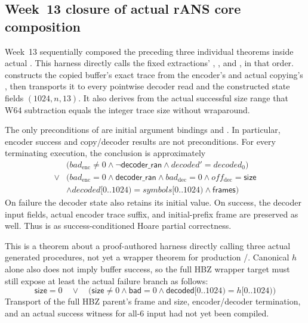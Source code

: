 \subsection{Week~13 closure of actual rANS core composition}

Week~13 sequentially composed the preceding three individual theorems inside
actual . This harness directly calls the
fixed extractions' ,
, and , in that order.
 constructs the copied buffer's
exact trace from the encoder's  and actual copying's
, then transports it to every pointwise decoder read and
the constructed state fields \((1024,n,13)\). It also derives from the actual
successful size range that W64 subtraction equals the integer trace size
without wraparound.

The only preconditions of 
are initial argument bindings and . In
particular, encoder success and copy/decoder results are not preconditions.
For every terminating execution, the conclusion is approximately
\[
\begin{aligned}
  &\bigl(bad_{\mathrm{enc}}\ne0
    \land\neg\mathsf{decoder\_ran}
    \land decoded'=decoded_0\bigr)\\
  {}\lor{}&\bigl(bad_{\mathrm{enc}}=0
    \land\mathsf{decoder\_ran}
    \land bad_{\mathrm{dec}}=0
    \land off_{\mathrm{dec}}=\mathsf{size}\\
    &\land decoded[0..1024)=symbols[0..1024)
    \land\mathsf{frames}\bigr)
\end{aligned}
\]
On failure the decoder state also retains its initial value. On success,
the decoder input fields, actual encoder trace suffix, and initial-prefix frame
are preserved as well. Thus  is \statusproved as
success-conditioned Hoare partial correctness.

This is a theorem about a proof-authored harness directly calling three
actual generated procedures, not yet a wrapper theorem for
production /.
Canonical \(h\) alone also does not imply buffer success, so the full HBZ
wrapper target must still expose at least the actual failure branch as follows:
\[
  \mathsf{size}=0\quad\lor\quad
  \bigl(\mathsf{size}\ne0\land
        \mathsf{bad}=0\land
        \mathsf{decoded}[0..1024)=h[0..1024)\bigr)
\]
Transport of the full HBZ parent's frame and size, encoder/decoder
termination, and an actual success witness for all-6 input had not yet been compiled.

